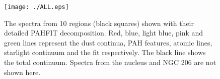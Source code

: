 %

\begin{figure}
\centering
\texttt{[image: ./ALL.eps]}
  \caption{The spectra from 10 regions (black squares) shown with their detailed PAHFIT decomposition. Red, blue, light blue, pink and green lines represent the dust continua, PAH features, atomic lines, starlight continuum and the fit respectively. The black line shows the total continuum. Spectra from the nucleus and NGC 206 are not shown here.}
\label{PAHFITplots}
\end{figure}


